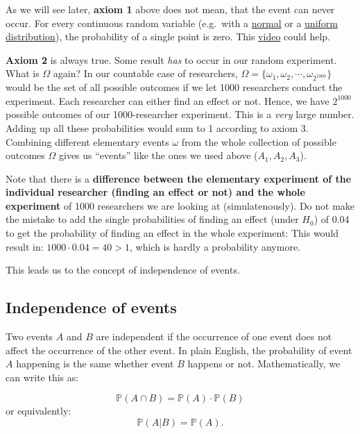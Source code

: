 \documentclass[
]{book}
\begin{document}
As we will see later, \textbf{axiom 1} above does not mean, that the event can never occur.
For every continuous random variable (e.g.~with a \href{https://en.wikipedia.org/wiki/Normal_distribution}{normal}
or a \href{https://en.wikipedia.org/wiki/Continuous_uniform_distribution}{uniform distribution}), the probability of a single point is zero.
This \href{https://www.youtube.com/watch?v=ZA4JkHKZM50&list=PLIhj5_pQwhMQfGZNQZREjDdJRt0t0sn51&index=10&ab_channel=3Blue1Brown}{video} could help.

\textbf{Axiom 2} is always true. Some result \emph{has} to occur in our random experiment.
What is \(\Omega\) again? In our countable case of researchers, \(\Omega = \{ \omega_1, \omega_2, \cdots, \omega_{2^{1000}} \}\) would be the set of all possible outcomes if we let 1000 researchers conduct the experiment.
Each researcher can either find an effect or not. Hence, we have \(2^{1000}\) possible outcomes of our 1000-researcher experiment. This is a \emph{very} large number. Adding up all
these probabilities would sum to 1 according to axiom 3. Combining different elementary events \(\omega\) from the whole collection of possible outcomes \(\Omega\)
gives us ``events'' like the ones we used above (\(A_1, A_2, A_3\)).

Note that there is a \textbf{difference between the elementary experiment of the individual researcher (finding an effect or not) and the whole experiment} of
1000 researchers we are looking at (simulatenously).
Do not make the mistake to add the single probabilities of finding an effect (under \(H_0\)) of 0.04 to get the probability of finding an effect in the whole experiment:
This would result in: \(1000 \cdot 0.04 = 40 > 1\), which is hardly a probability anymore.

This leads us to the concept of independence of events.

\subsection{Independence of events}\label{independence-of-events}

Two events \(A\) and \(B\) are independent if the occurrence of one event does not affect the occurrence of the other event. In plain English,
the probability of event \(A\) happening is the same whether event \(B\) happens or not. Mathematically, we can write this as:

\[\mathbb{P}(A \cap B) = \mathbb{P}(A) \cdot \mathbb{P}(B)\] or equivalently:
\[\mathbb{P}(A | B) = \mathbb{P}(A).\]
\end{document}
